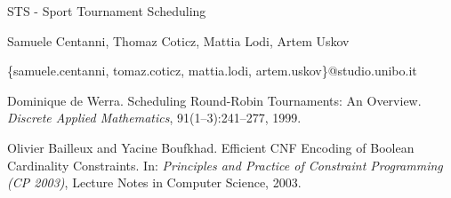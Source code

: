 \documentclass{article}
\date{September 2025}
\begin{document}
    \begin{titlepage}
        \begin{center}
            {\LARGE STS - Sport Tournament Scheduling }
            \vspace*{1em}
            
            Samuele Centanni, Thomaz Coticz, Mattia Lodi, Artem Uskov

            \centerline{\{samuele.centanni, tomaz.coticz, mattia.lodi, artem.uskov\}@studio.unibo.it}
        \end{center}
    \end{titlepage}

  
     
    

\begin{thebibliography}{9}

Dominique de Werra.
\newblock Scheduling Round-Robin Tournaments: An Overview.
\newblock \emph{Discrete Applied Mathematics}, 91(1–3):241--277, 1999.

Olivier Bailleux and Yacine Boufkhad.
\newblock Efficient CNF Encoding of Boolean Cardinality Constraints.
\newblock In: \emph{Principles and Practice of Constraint Programming (CP 2003)}, Lecture Notes in Computer Science, 2003.
\end{thebibliography}
\end{document}
